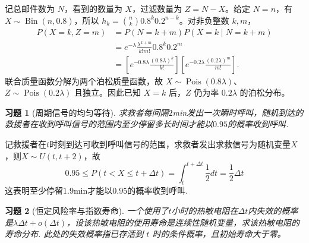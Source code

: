 \documentclass[12pt,fontset=fandol]{ctexart}
\newtheorem{exercise}{习题}[section]
\begin{document}
\begin{solve}\label{a:Y3.9}记总邮件数为 $N$，看到的数量为 $X$，过滤数量为 $Z=N-X$。给定 $N=n$，有 $X\sim\operatorname{Bin}(n,0.8)$，所以 $h_k=\binom nk0.8^k0.2^{n-k}$。对非负整数 $k,m$，\[\begin{aligned}P(X=k,Z=m)&=P(N=k+m)P(X=k\mid N=k+m)\\&=e^{-\lambda}\frac{\lambda^{k+m}}{k!m!}0.8^k0.2^m\\&=\left[e^{-0.8\lambda}\frac{(0.8\lambda)^k}{k!}\right]\left[e^{-0.2\lambda}\frac{(0.2\lambda)^m}{m!}\right].\end{aligned}\]联合质量函数分解为两个泊松质量函数，故 $X\sim\operatorname{Pois}(0.8\lambda)$、$Z\sim\operatorname{Pois}(0.2\lambda)$ 且独立。因此已知 $X=k$ 后，$Z$ 仍为率 $0.2\lambda$ 的泊松分布。\end{solve}

\begin{exercise}[周期信号的均匀等待]\label{q:Y3.13}
求救者每间隔$2$min发出一次瞬时呼叫，随机到达的救援者在收到呼叫信号的范围内至少停留多长时间才能以$0.95$的概率收到呼叫.\par{}
\end{exercise}

\begin{solve}\label{a:Y3.13}
记救援者在$t$时刻到达可收到呼叫信号的范围，求救者发出求救信号为随机变量$X$，则$X\sim U(t,t+2)$，故
\[0.95 \leqslant P(t < X \leqslant t + \Delta t) = \int_t^{t + \Delta t} {\frac{1}{2}dt}  = \frac{1}{2}\Delta t\]
这表明至少停留$1.9$min才能以$0.95$的概率收到呼叫.
\end{solve}

\begin{exercise}[恒定风险率与指数寿命]\label{q:Y3.14}
一个使用了$t$小时的热敏电阻在$\Delta t$内失效的概率是$\lambda \Delta t+o(\Delta t)$，设该热敏电阻的使用寿命是连续性随机变量，求该热敏电阻的寿命分布. 此处的失效概率指已存活到 $t$ 时的条件概率，且初始寿命大于零。\par{}
\end{exercise}
\end{document}
